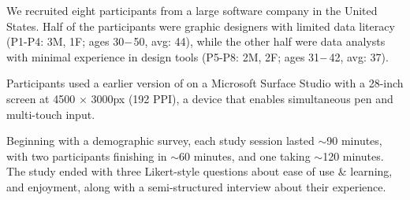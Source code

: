 \vspace{2mm}
We recruited eight participants from a large software company in the United States. Half of the participants were graphic designers with limited data literacy (P1-P4: 3M, 1F; ages 30$\--$50, avg: 44), while the other half were data analysts with minimal experience in design tools (P5-P8: 2M, 2F; ages 31$\--$42, avg: 37). 

\vspace{2mm}
Participants used a earlier version of \toolname{} on a Microsoft Surface Studio with a 28-inch screen at 4500 $\times$ 3000px (192 PPI), a device that enables simultaneous pen and multi-touch input.




\vspace{2mm}
Beginning with a demographic survey, each study session lasted $\sim$90 minutes, with two participants finishing in $\sim$60 minutes, and one taking $\sim$120 minutes.  The study ended with three Likert-style questions about ease of use \& learning, and enjoyment, along with a semi-structured interview about their experience.


